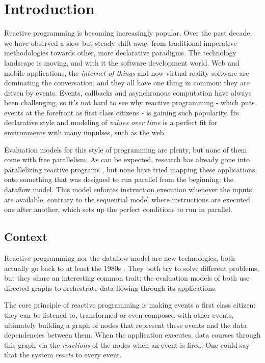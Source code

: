 
\chapter{Introduction}

Reactive programming is becoming increasingly popular. Over the past decade, we have observed a slow but steady shift away from traditional imperative methodologies towards other, more declarative paradigms.
The technology landscape is moving, and with it the software development world. Web and mobile applications, the \textit{internet of things} and now virtual reality software are dominating the conversation, and they all have one thing in common: they are driven by events. Events, callbacks and asynchronous computation have always been challenging, so it's not hard to see why reactive programming - which puts events at the forefront as first class citizens - is gaining such popularity. Its declarative style and modeling of \textit{values over time} is a perfect fit for environments with many impulses, such as the web.

Evaluation models for this style of programming are plenty, but none of them come with free parallelism. As can be expected, research has already gone into parallelizing reactive programs \citep{peterson_parallel_2000}, but none have tried mapping these applications onto something that was designed to run parallel from the beginning: the dataflow model. 
This model enforces instruction execution whenever the inputs are available, contrary to the sequential model where instructions are executed one after another, which sets up the perfect conditions to run in parallel.

\section{Context}

Reactive programming nor the dataflow model are new technologies, both actually go back to at least the 1980s \citep{harel_development_1985, veen_dataflow_1986}. They both try to solve different problems, but they share an interesting common trait: the evaluation models of both use directed graphs to orchestrate data flowing through its applications. 

The core principle of reactive programming is making events a first class citizen: they can be listened to, transformed or even composed with other events, ultimately building a graph of nodes that represent these events and the data dependencies between them. When the application executes, data courses through this graph via the \textit{reactions} of the nodes when an event is fired. One could say that the system \textit{reacts} to every event.

